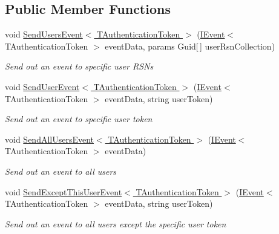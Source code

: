 \subsection*{Public Member Functions}
\begin{DoxyCompactItemize}
\item 
void \hyperlink{interfaceCqrs_1_1WebApi_1_1SignalR_1_1Hubs_1_1INotificationHub_a85bd03a0bf9c2083822c4b67691f4297}{Send\+Users\+Event$<$ T\+Authentication\+Token $>$} (\hyperlink{interfaceCqrs_1_1Events_1_1IEvent}{I\+Event}$<$ T\+Authentication\+Token $>$ event\+Data, params Guid\mbox{[}$\,$\mbox{]} user\+Rsn\+Collection)
\begin{DoxyCompactList}\small\item\em Send out an event to specific user R\+S\+Ns \end{DoxyCompactList}\item 
void \hyperlink{interfaceCqrs_1_1WebApi_1_1SignalR_1_1Hubs_1_1INotificationHub_a88cb05c6807058bfe2bff48427a45ad2}{Send\+User\+Event$<$ T\+Authentication\+Token $>$} (\hyperlink{interfaceCqrs_1_1Events_1_1IEvent}{I\+Event}$<$ T\+Authentication\+Token $>$ event\+Data, string user\+Token)
\begin{DoxyCompactList}\small\item\em Send out an event to specific user token \end{DoxyCompactList}\item 
void \hyperlink{interfaceCqrs_1_1WebApi_1_1SignalR_1_1Hubs_1_1INotificationHub_ada48332e18931747c81997f8350f4066}{Send\+All\+Users\+Event$<$ T\+Authentication\+Token $>$} (\hyperlink{interfaceCqrs_1_1Events_1_1IEvent}{I\+Event}$<$ T\+Authentication\+Token $>$ event\+Data)
\begin{DoxyCompactList}\small\item\em Send out an event to all users \end{DoxyCompactList}\item 
void \hyperlink{interfaceCqrs_1_1WebApi_1_1SignalR_1_1Hubs_1_1INotificationHub_a6a50d35b8df69bb6d5fa9d31902c8ace}{Send\+Except\+This\+User\+Event$<$ T\+Authentication\+Token $>$} (\hyperlink{interfaceCqrs_1_1Events_1_1IEvent}{I\+Event}$<$ T\+Authentication\+Token $>$ event\+Data, string user\+Token)
\begin{DoxyCompactList}\small\item\em Send out an event to all users except the specific user token \end{DoxyCompactList}\end{DoxyCompactItemize}


